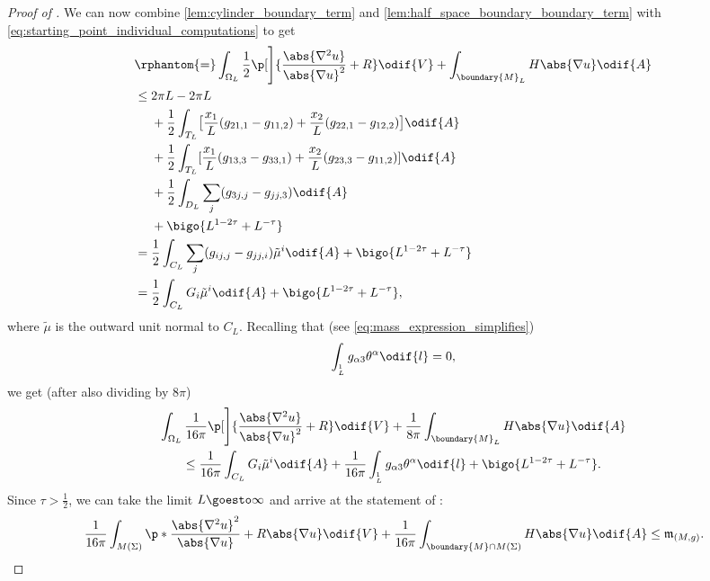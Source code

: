 \documentclass[titlepage,numbers=noenddot,headinclude,oneside,%
footinclude=true,cleardoublepage=empty,%
BCOR=5mm,paper=a4,fontsize=11pt,%
english,%
]{scrartcl}
\let\sphere\relax
\newcommand{\sphere}{\mathbb{S}}
\newcommand{\mass}[2]{\mathfrak{m}_{(#1,#2)}} %
\begin{document}
\begin{proof}[Proof of ]
    We can now combine \cref{lem:cylinder_boundary_term} and \cref{lem:half_space_boundary_boundary_term} with \cref{eq:starting_point_individual_computations}
     to get
    \begin{equation*}
        \begin{aligned}[t]
            &\rphantom{=}\int_{\Omega_L} \frac{1}{2}\p[\Bigg]{\frac{\abs{\nabla^2 u}}{\abs{\nabla u}^2}+R }\odif{V}+\int_{\boundary{M}_L} H\abs{\nabla u}\odif{A}\\
            & \leq \begin{aligned}[t]
                &2\pi L- 2\pi L\\
                &+\frac{1}{2}\int_{T_L}\bigl[\frac{x_1}{L}(g_{21,1}-g_{11,2})+\frac{x_2}{L}(g_{22,1}-g_{12,2})\bigr]\odif{A}\\
                &+\frac{1}{2}\int_{T_L}[\frac{x_1}{L}(g_{13,3}-g_{33,1})+\frac{x_2}{L}(g_{23,3}-g_{11,2})]\odif{A}\\
                &+\frac{1}{2}\int_{D_L}\sum_{j}(g_{3j,j}-g_{jj,3})\odif{A}\\
                &+\bigo{L^{1-2\tau}+L^{-\tau}}
            \end{aligned}\\
            &=\frac{1}{2}\int_{C_L}\sum_{j}(g_{ij,j}-g_{jj,i})\tilde{\mu}^i\odif{A}+\bigo{L^{1-2\tau}+L^{-\tau}}\\
            &=\frac{1}{2}\int_{C_L}G_i\tilde{\mu}^i\odif{A}+\bigo{L^{1-2\tau}+L^{-\tau}},
        \end{aligned}
    \end{equation*}
    where \( \tilde{\mu} \) is the outward unit normal to \( C_L \). Recalling that (see \cref{eq:mass_expression_simplifies})
    \begin{equation*}
        \int_{\sphere^1_L}g_{\alpha3}\theta^\alpha\odif{l}=0,
    \end{equation*}
    we get (after also dividing by \( 8\pi \))
    \begin{multline*}
        \int_{\Omega_L} \frac{1}{16\pi}\p[\Bigg]{\frac{\abs{\nabla^2 u}}{\abs{\nabla u}^2}+R }\odif{V}+\frac{1}{8\pi}\int_{\boundary{M}_L}H\abs{\nabla u}\odif{A}\\
        \leq \frac{1}{16\pi}\int_{C_L}G_i\tilde{\mu}^i\odif{A}+\frac{1}{16\pi}\int_{\sphere^1_L}g_{\alpha3}\theta^\alpha\odif{l}+\bigo{L^{1-2\tau}+L^{-\tau}}.
    \end{multline*}
    Since \( \tau>\frac{1}{2} \), we can take the limit \( L\goesto \infty \) and arrive at the statement of :
    \begin{equation*}
        \frac{1}{16\pi}\int_{M(\Sigma)}\p*{\frac{\abs{\nabla^2 u}^2}{\abs{\nabla u}}+R\abs{\nabla u}}\odif{V}+\frac{1}{16\pi}\int_{\boundary{M}\cap M(\Sigma)}H \abs{\nabla u}\odif{A}\leq \mass{M}{g}.
    \end{equation*}
\end{proof}
\end{document}
